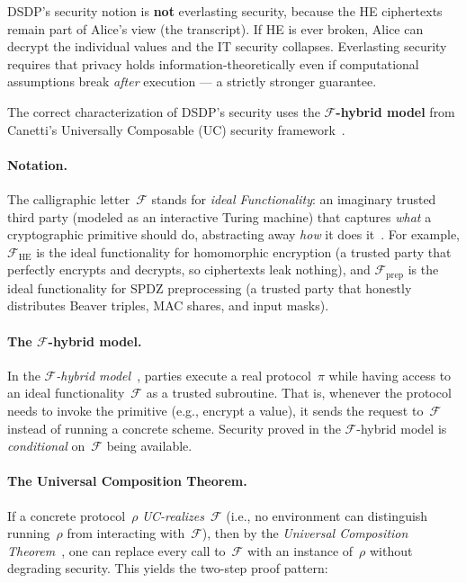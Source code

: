\documentclass{article}
\begin{document}
DSDP's security notion is \textbf{not} everlasting security, because the HE ciphertexts remain part of Alice's view (the transcript). If HE is ever broken, Alice can decrypt the individual values and the IT security collapses. Everlasting security~\cite{MullerQuadeUnruh2007,MullerQuadeUnruh2010} requires that privacy holds information-theoretically even if computational assumptions break \emph{after} execution --- a strictly stronger guarantee.

The correct characterization of DSDP's security uses the \textbf{$\mathcal{F}$-hybrid model} from Canetti's Universally Composable (UC) security framework~\cite{Canetti2001,Canetti2020}.

\paragraph{Notation.}
The calligraphic letter~$\mathcal{F}$ stands for \emph{ideal Functionality}: an imaginary trusted third party (modeled as an interactive Turing machine) that captures \emph{what} a cryptographic primitive should do, abstracting away \emph{how} it does it~\cite[Sec.~4: Defining Security of Protocols]{Canetti2020}. For example, $\mathcal{F}_{\mathrm{HE}}$ is the ideal functionality for homomorphic encryption (a trusted party that perfectly encrypts and decrypts, so ciphertexts leak nothing), and $\mathcal{F}_{\mathrm{prep}}$ is the ideal functionality for SPDZ preprocessing (a trusted party that honestly distributes Beaver triples, MAC shares, and input masks).

\paragraph{The $\mathcal{F}$-hybrid model.}
In the \emph{$\mathcal{F}$-hybrid model}~\cite[Sec.~5: Modular Composition]{Canetti2020}, parties execute a real protocol~$\pi$ while having access to an ideal functionality~$\mathcal{F}$ as a trusted subroutine. That is, whenever the protocol needs to invoke the primitive (e.g., encrypt a value), it sends the request to~$\mathcal{F}$ instead of running a concrete scheme. Security proved in the $\mathcal{F}$-hybrid model is \emph{conditional} on~$\mathcal{F}$ being available.

\paragraph{The Universal Composition Theorem.}
If a concrete protocol~$\rho$ \emph{UC-realizes}~$\mathcal{F}$ (i.e., no environment can distinguish running~$\rho$ from interacting with~$\mathcal{F}$), then by the \emph{Universal Composition Theorem}~\cite[Theorem~5.1]{Canetti2020}, one can replace every call to~$\mathcal{F}$ with an instance of~$\rho$ without degrading security. This yields the two-step proof pattern:
\end{document}
